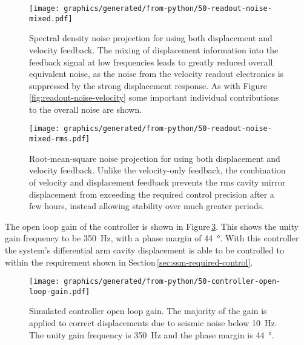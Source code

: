 \begin{figure}
  \centering
  \texttt{[image: graphics/generated/from-python/50-readout-noise-mixed.pdf]}
  \caption[Spectral density noise projection for \LMINUS{} using both displacement and velocity feedback]{\label{fig:readout-noise-mixed}Spectral density noise projection for \LMINUS{} using both displacement and velocity feedback. The mixing of displacement information into the feedback signal at low frequencies leads to greatly reduced overall equivalent \LMINUS{} noise, as the noise from the velocity readout electronics is suppressed by the strong displacement response. As with Figure\,\ref{fig:readout-noise-velocity} some important individual contributions to the overall noise are shown.}
\end{figure}

\begin{figure}
  \centering
  \texttt{[image: graphics/generated/from-python/50-readout-noise-mixed-rms.pdf]}
  \caption[Root-mean-square noise projection for \LMINUS{} using both displacement and velocity feedback]{\label{fig:readout-noise-mixed-rms}Root-mean-square noise projection for \LMINUS{} using both displacement and velocity feedback. Unlike the velocity-only feedback, the combination of velocity and displacement feedback prevents the rms cavity mirror displacement from exceeding the required control precision after a few hours, instead allowing stability over much greater periods.}
\end{figure}

The open loop gain of the controller is shown in Figure\,\ref{fig:open-loop-gain}. This shows the unity gain frequency to be \SI{350}{\hertz}, with a phase margin of \SI{44}{\degree}. With this controller the system's differential arm cavity displacement is able to be controlled to within the requirement shown in Section\,\ref{sec:ssm-required-control}.

\begin{figure}
  \texttt{[image: graphics/generated/from-python/50-controller-open-loop-gain.pdf]}
  \caption[Simulated controller open loop gain]{\label{fig:open-loop-gain}Simulated \SSM{} controller open loop gain. The majority of the gain is applied to correct displacements due to seismic noise below \SI{10}{\hertz}. The unity gain frequency is \SI{350}{\hertz} and the phase margin is \SI{44}{\degree}.}
\end{figure}

